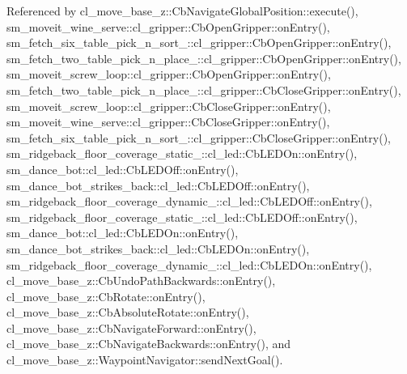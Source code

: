 Referenced by cl\+\_\+move\+\_\+base\+\_\+z\+::\+Cb\+Navigate\+Global\+Position\+::execute(), sm\+\_\+moveit\+\_\+wine\+\_\+serve\+::cl\+\_\+gripper\+::\+Cb\+Open\+Gripper\+::on\+Entry(), sm\+\_\+fetch\+\_\+six\+\_\+table\+\_\+pick\+\_\+n\+\_\+sort\+\_\+::cl\+\_\+gripper\+::\+Cb\+Open\+Gripper\+::on\+Entry(), sm\+\_\+fetch\+\_\+two\+\_\+table\+\_\+pick\+\_\+n\+\_\+place\+\_\+::cl\+\_\+gripper\+::\+Cb\+Open\+Gripper\+::on\+Entry(), sm\+\_\+moveit\+\_\+screw\+\_\+loop\+::cl\+\_\+gripper\+::\+Cb\+Open\+Gripper\+::on\+Entry(), sm\+\_\+fetch\+\_\+two\+\_\+table\+\_\+pick\+\_\+n\+\_\+place\+\_\+::cl\+\_\+gripper\+::\+Cb\+Close\+Gripper\+::on\+Entry(), sm\+\_\+moveit\+\_\+screw\+\_\+loop\+::cl\+\_\+gripper\+::\+Cb\+Close\+Gripper\+::on\+Entry(), sm\+\_\+moveit\+\_\+wine\+\_\+serve\+::cl\+\_\+gripper\+::\+Cb\+Close\+Gripper\+::on\+Entry(), sm\+\_\+fetch\+\_\+six\+\_\+table\+\_\+pick\+\_\+n\+\_\+sort\+\_\+::cl\+\_\+gripper\+::\+Cb\+Close\+Gripper\+::on\+Entry(), sm\+\_\+ridgeback\+\_\+floor\+\_\+coverage\+\_\+static\+\_\+::cl\+\_\+led\+::\+Cb\+L\+E\+D\+On\+::on\+Entry(), sm\+\_\+dance\+\_\+bot\+::cl\+\_\+led\+::\+Cb\+L\+E\+D\+Off\+::on\+Entry(), sm\+\_\+dance\+\_\+bot\+\_\+strikes\+\_\+back\+::cl\+\_\+led\+::\+Cb\+L\+E\+D\+Off\+::on\+Entry(), sm\+\_\+ridgeback\+\_\+floor\+\_\+coverage\+\_\+dynamic\+\_\+::cl\+\_\+led\+::\+Cb\+L\+E\+D\+Off\+::on\+Entry(), sm\+\_\+ridgeback\+\_\+floor\+\_\+coverage\+\_\+static\+\_\+::cl\+\_\+led\+::\+Cb\+L\+E\+D\+Off\+::on\+Entry(), sm\+\_\+dance\+\_\+bot\+::cl\+\_\+led\+::\+Cb\+L\+E\+D\+On\+::on\+Entry(), sm\+\_\+dance\+\_\+bot\+\_\+strikes\+\_\+back\+::cl\+\_\+led\+::\+Cb\+L\+E\+D\+On\+::on\+Entry(), sm\+\_\+ridgeback\+\_\+floor\+\_\+coverage\+\_\+dynamic\+\_\+::cl\+\_\+led\+::\+Cb\+L\+E\+D\+On\+::on\+Entry(), cl\+\_\+move\+\_\+base\+\_\+z\+::\+Cb\+Undo\+Path\+Backwards\+::on\+Entry(), cl\+\_\+move\+\_\+base\+\_\+z\+::\+Cb\+Rotate\+::on\+Entry(), cl\+\_\+move\+\_\+base\+\_\+z\+::\+Cb\+Absolute\+Rotate\+::on\+Entry(), cl\+\_\+move\+\_\+base\+\_\+z\+::\+Cb\+Navigate\+Forward\+::on\+Entry(), cl\+\_\+move\+\_\+base\+\_\+z\+::\+Cb\+Navigate\+Backwards\+::on\+Entry(), and cl\+\_\+move\+\_\+base\+\_\+z\+::\+Waypoint\+Navigator\+::send\+Next\+Goal().


